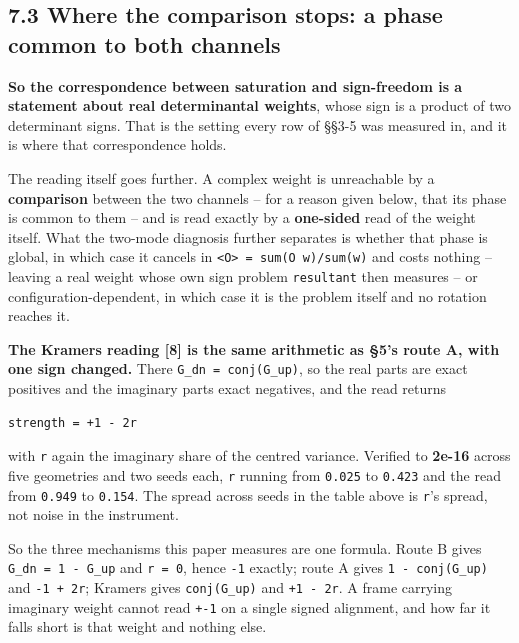 \documentclass[10pt,letterpaper,twocolumn]{article}
\begin{document}
\subsection{7.3 Where the comparison stops: a phase common to both channels}\label{73-where-the-comparison-stops-a-phase-common-to-both-channels}

\textbf{So the correspondence between saturation and sign-freedom is a statement about real
determinantal weights}, whose sign is a product of two determinant signs. That is the setting
every row of §§3-5 was measured in, and it is where that correspondence holds.

The reading itself goes further. A complex weight is unreachable by
a \textbf{comparison} between the two channels -- for a reason given below, that its phase is common to
them -- and is read exactly by a \textbf{one-sided} read of the weight itself. What the two-mode
diagnosis further separates is whether that phase is global, in which case it cancels in
\texttt{\textless{}\allowbreak{}O\textgreater{}\allowbreak{}\ =\allowbreak{}\ sum(\allowbreak{}O\ w)\allowbreak{}/\allowbreak{}sum(\allowbreak{}w)\allowbreak{}} and costs nothing -- leaving a real weight whose own sign problem
\texttt{resultant} then measures -- or configuration-dependent, in which case it is the problem itself and
no rotation reaches it.

\textbf{The Kramers reading {[}8{]} is the same arithmetic as §5's route A, with one sign changed.} There
\texttt{G\_\allowbreak{}dn\ =\allowbreak{}\ conj(\allowbreak{}G\_\allowbreak{}up)\allowbreak{}}, so the real parts are exact positives and the imaginary parts exact negatives,
and the read returns

\begin{verbatim}
strength = +1 - 2r
\end{verbatim}

with \texttt{r} again the imaginary share of the centred variance. Verified to \textbf{2e-16} across five
geometries and two seeds each, \texttt{r} running from \texttt{0.\allowbreak{}025} to \texttt{0.\allowbreak{}423} and the read from \texttt{0.\allowbreak{}949} to
\texttt{0.\allowbreak{}154}. The spread across seeds in the table above is \texttt{r}'s spread, not noise in the instrument.

So the three mechanisms this paper measures are one formula. Route B gives \texttt{G\_\allowbreak{}dn\ =\allowbreak{}\ 1\ -{}\allowbreak{}\ G\_\allowbreak{}up} and
\texttt{r\ =\allowbreak{}\ 0}, hence \texttt{-{}\allowbreak{}1} exactly; route A gives \texttt{1\ -{}\allowbreak{}\ conj(\allowbreak{}G\_\allowbreak{}up)\allowbreak{}} and \texttt{-{}\allowbreak{}1\ +\allowbreak{}\ 2r}; Kramers gives
\texttt{conj(\allowbreak{}G\_\allowbreak{}up)\allowbreak{}} and \texttt{+\allowbreak{}1\ -{}\allowbreak{}\ 2r}. A frame carrying imaginary weight cannot read \texttt{+\allowbreak{}-{}\allowbreak{}1} on a single signed
alignment, and how far it falls short is that weight and nothing else.
\end{document}

